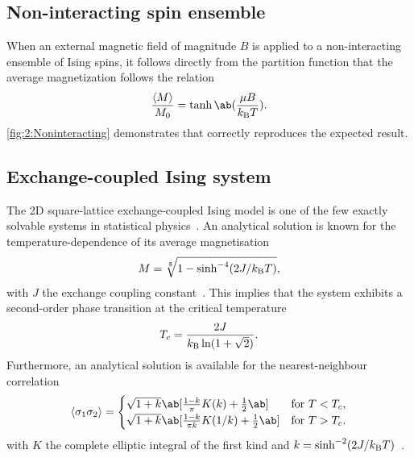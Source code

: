 \subsection{Non-interacting spin ensemble}

When an external magnetic field of magnitude $B$ is applied to a non-interacting ensemble of Ising spins, it follows directly from the partition function that the average magnetization follows the relation
\begin{equation}
	\frac{\langle M \rangle}{M_0} = \tanh\ab(\frac{\mu B}{\kBT}) \mathrm{.}
\end{equation}
\cref{fig:2:Noninteracting} demonstrates that \hotspice{} correctly reproduces the expected result.


\subsection{Exchange-coupled Ising system}
The 2D square-lattice exchange-coupled Ising model is one of the few exactly solvable systems in statistical physics~\cite{ExactlySolvedModelsStatMech}.
An analytical solution is known for the temperature-dependence of its average magnetisation
\begin{equation}
	M = \sqrt[8]{1 - \sinh^{-4}(2J/\kBT)} \mathrm{,}
	\label{eq:2:Verification_exchange_M}
\end{equation}
with $J$ the exchange coupling constant~\cite{Correlations2DIsing,IsingSpontaneousMagnetization,coey2010magnetism}.
This implies that the system exhibits a second-order phase transition at the critical temperature~\cite{ExactlySolvedModelsStatMech}
\begin{equation}
	T_c = \frac{2J}{\kB \ln(1 + \sqrt{2})} \mathrm{.}
\end{equation}
Furthermore, an analytical solution is available for the nearest-neighbour correlation
\begin{equation}
	\langle \sigma_{1} \sigma_{2} \rangle = 
	\begin{cases}
		\sqrt{1+k} \ab[\frac{1-k}{\pi}K(k) + \frac{1}{2} \ab] &\text{for } T < T_c \mathrm{,} \\ 
		\sqrt{1+k} \ab[\frac{1-k}{\pi k}K(1/k) + \frac{1}{2} \ab] &\text{for } T > T_c \mathrm{.} \\ 
	\end{cases}
\end{equation}
with $K$ the complete elliptic integral of the first kind and $k=\sinh^{-2}(2J/\kBT)$~\cite{Correlations2DIsing}. \\\par

